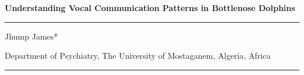 \documentclass{article}
\begin{document}
\vspace*{1cm} %

\begin{center}
    {\fontsize{16}{22}\selectfont\color{color_29791}
    \textbf{Understanding Vocal Communication Patterns in Bottlenose Dolphins}\par
    }
    \vspace{0cm}
    \color{color_100238}\rule{0.97\textwidth}{0.5pt}
    \vspace{0.1cm}
\end{center}


\begin{center}
\vspace*{-0.5cm}
    \fontsize{11}{13.2}\selectfont\color{color_29791}Jhump James*\par
    \vspace{0cm}
    \fontsize{9}{10.8}\selectfont\color{color_29791}Department of Psychiatry, The University of Mostaganem, Algeria, Africa\par
    \vspace{0.1cm}
    \color{color_100238}\rule{0.6\textwidth}{1pt}
\end{center}
\end{document}
